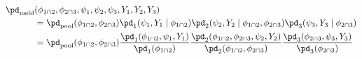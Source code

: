 \begin{align}
  \pd_{\text{meld}} &(\phi_{1 \cap 2}, \phi_{2 \cap 3}, \psi_{1}, \psi_{2}, \psi_{3}, Y_{1}, Y_{2}, Y_{3}) \nonumber \\  &=   
    \pd_{\text{pool}}(\phi_{1 \cap 2}, \phi_{2 \cap 3})
    \pd_{1} (\psi_{1}, Y_{1} \mid \phi_{1 \cap 2})
    \pd_{2} (\psi_{2}, Y_{2} \mid \phi_{1 \cap 2}, \phi_{2 \cap 3})
    \pd_{3} (\psi_{3}, Y_{3} \mid \phi_{2 \cap 3})
    \nonumber  
    \\ &= 
    \pd_{\text{pool}}(\phi_{1 \cap 2}, \phi_{2 \cap 3})
    \frac {
      \pd_{1} (\phi_{1 \cap 2}, \psi_{1}, Y_{1})
    } {
      \pd_{1}(\phi_{1 \cap 2})
    }
    \frac {
      \pd_{2} (\phi_{1 \cap 2}, \phi_{2 \cap 3}, \psi_{2}, Y_{2})
    } {
      \pd_{2}(\phi_{1 \cap 2}, \phi_{2 \cap 3})
    }
    \frac {
      \pd_{3} (\phi_{2 \cap 3}, \psi_{3}, Y_{3})
    } {
      \pd_{3}(\phi_{2 \cap 3})
    }  
  \label{eqn:melded-model}
\end{align}